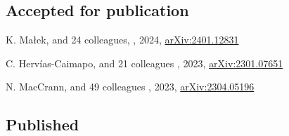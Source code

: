 
\subsection*{Accepted for publication}

\begin{etaremune}

\item
K. Małek, and 24 colleagues,
,
2024, \href{https://ui.adsabs.harvard.edu/abs/2024arXiv240112831M}{arXiv:2401.12831}
\accepted{\aap}

\item
C. Herv\'ias-Caimapo, and 21 colleagues
,
2023, \href{https://ui.adsabs.harvard.edu/abs/2023arXiv230107651H}{arXiv:2301.07651}
\accepted{\mnras}

\item
N. MacCrann, and 49 colleagues
,
2023, \href{https://ui.adsabs.harvard.edu/abs/2023arXiv230405196M}{arXiv:2304.05196}
\accepted{\apj}

\end{etaremune}



\subsection*{Published}

